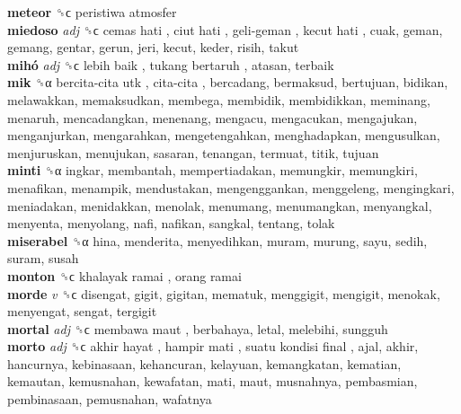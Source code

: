 \textbf{meteor} ␝ϲ   peristiwa atmosfer   \\
\textbf{miedoso} \emph{adj}  ␝ϲ   cemas hati ,  ciut hati ,  geli-geman ,  kecut hati , cuak, geman, gemang, gentar, gerun, jeri, kecut, keder, risih, takut  \\
\textbf{mihó} \emph{adj}  ␝ϲ   lebih baik ,  tukang bertaruh , atasan, terbaik  \\
\textbf{mik} ␝α   bercita-cita utk ,  cita-cita , bercadang, bermaksud, bertujuan, bidikan, melawakkan, memaksudkan, membega, membidik, membidikkan, meminang, menaruh, mencadangkan, menenang, mengacu, mengacukan, mengajukan, menganjurkan, mengarahkan, mengetengahkan, menghadapkan, mengusulkan, menjuruskan, menujukan, sasaran, tenangan, termuat, titik, tujuan  \\
\textbf{minti} ␝α  ingkar, membantah, mempertiadakan, memungkir, memungkiri, menafikan, menampik, mendustakan, mengenggankan, menggeleng, mengingkari, meniadakan, menidakkan, menolak, menumang, menumangkan, menyangkal, menyenta, menyolang, nafi, nafikan, sangkal, tentang, tolak  \\
\textbf{miserabel} ␝α  hina, menderita, menyedihkan, muram, murung, sayu, sedih, suram, susah  \\
\textbf{monton} ␝ϲ   khalayak ramai ,  orang ramai   \\
\textbf{morde} \emph{v}  ␝ϲ  disengat, gigit, gigitan, mematuk, menggigit, mengigit, menokak, menyengat, sengat, tergigit  \\
\textbf{mortal} \emph{adj}  ␝ϲ   membawa maut , berbahaya, letal, melebihi, sungguh  \\
\textbf{morto} \emph{adj}  ␝ϲ   akhir hayat ,  hampir mati ,  suatu kondisi final , ajal, akhir, hancurnya, kebinasaan, kehancuran, kelayuan, kemangkatan, kematian, kemautan, kemusnahan, kewafatan, mati, maut, musnahnya, pembasmian, pembinasaan, pemusnahan, wafatnya  \\
